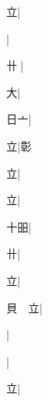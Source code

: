 \begin{multicols}{2}
{{\cjk{}{\cnsym{}　}{\cnsym{}　}立}|{}\par
{}|{}\par
{\cjk{}{\cnsym{}　}卄{\cnxJzr{}}}|{}\par
{\cjk{}{\cnsym{}　}{\cnsym{}　}大}|{}\par
{\cjk{}{\cnsym{}　}日亠}|{}\par
{\cjk{}{\cnsym{}　}{\cnsym{}　}立}|{\cjk{}彰}\par
{立}|{}\par
{\cjk{}{\cnsym{}　}{\cnsym{}　}立}|{}\par
{\cjk{}{\cnsym{}　}十昍}|{}\par
{\cjk{}{\cnsym{}　}{\cnsym{}　}卄}|{}\par
{\cjk{}{\cnsym{}　}{\cnsym{}　}立}|{}\par
{\cjk{}貝{\cnsym{}　}立}|{}\par
{}|{}\par
{}|{}\par
{\cjk{}{\cnsym{}　}{\cnsym{}　}立}|{}\par
}
\end{multicols}
